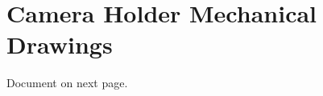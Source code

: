 \chapter{Camera Holder Mechanical Drawings}
\label{app:camera_holder_mechanical_drawings}

Document on next page.

